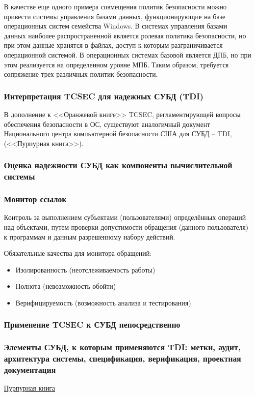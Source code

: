 В качестве еще одного примера совмещения политик безопасности можно привести системы управления базами данных, функционирующие на базе операционных систем семейства Windows. В системах управления базами данных наиболее распространенной является ролевая политика безопасности, но при этом данные хранятся в файлах, доступ к которым разграничивается операционной системой. В операционных системах базовой является ДПБ, но при этом реализуется на определенном уровне МПБ. Таким образом, требуется сопряжение трех различных политик безопасности.

\subsubsection{Интерпретация TCSEC для надежных СУБД (TDI)}
В дополнение к <<Оранжевой книге>> TCSEC, регламентирующей вопросы обеспечения безопасности в ОС, существуют аналогичный документ Национального центра компьютерной безопасности США для СУБД -- TDI, (<<Пурпурная книга>>).

\subsubsection{Оценка надежности СУБД как компоненты вычислительной системы}
\subsubsection{Монитор ссылок}
Контроль за выполнением субъектами (пользователями) определённых операций над объектами, путем проверки допустимости обращения (данного пользователя) к программам и данным разрешенному набору действий.

Обязательные качества для монитора обращений:
\begin{itemize}
	\item Изолированность (неотслеживаемость работы)
	\item Полнота (невозможность обойти)
	\item Верифицируемость (возможность анализа и тестирования)
\end{itemize}

\subsubsection{Применение TCSEC к СУБД непосредственно}
\subsubsection{Элементы СУБД, к которым применяются TDI: метки, аудит, архитектура системы, спецификация, верификация, проектная документация}
\href{https://web.archive.org/web/20160303230445/http://ftp.fas.org/irp/nsa/rainbow/tg021.htm}{Пурпурная книга}
